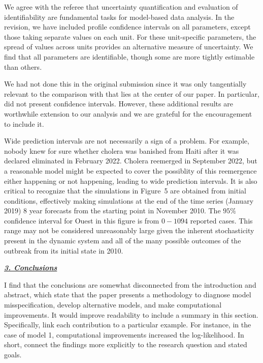 \documentclass[11pt]{article}
\newcommand\report[1]{{\color{mygreen} \vspace{1mm}\hspace{0.25in}\parbox{6in}{\em #1}}}
\begin{document}
We agree with the referee that uncertainty quantification and evaluation of identifiability are fundamental tasks for model-based data analysis.
In the revision, we have included profile confidence intervals on all parameters, except those taking separate values on each unit.
For these unit-specific parameters, the spread of values across units provides an alternative measure of uncertainty.
We find that all parameters are identifiable, though some are more tightly estimable than others.

We had not done this in the original submission since it was only tangentially relevant to the comparison with \cite{lee20} that lies at the center of our paper.
In particular, \cite{lee20} did not present confidence intervals.
However, these additional results are worthwhile extension to our analysis and we are grateful for the encouragement to include it.

Wide prediction intervals are not necessarily a sign of a problem.
For example, nobody knew for sure whether cholera was banished from Haiti after it was declared eliminated in February 2022.
Cholera reemerged in September 2022, but a reasonable model might be expected to cover the possiblity of this reemergence either happening or not happening, leading to wide prediction intervals.
It is also critical to recognize that the simulations in Figure~5 are obtained from initial conditions, effectively making simulations at the end of the time series (January 2019) 8 year forecasts from the starting point in November 2010.
The $95\%$ confidence interval for Ouest in this figure is from $0-1094$ reported cases. This range may not be considered unreasonably large given the inherent stochasticity present in the dynamic system and all of the many possible outcomes of the outbreak from its initial state in 2010.

\report{
  \textbf{\underline{3. Conclusions}}

  I find that the conclusions are somewhat disconnected from the introduction and abstract, which state that the paper presents a methodology to diagnose model misspecification, develop alternative models, and make computational improvements. It would improve readability to include a summary in this section. Specifically, link each contribution to a particular example. For instance, in the case of model 1, computational improvements increased the log-likelihood. In short, connect the findings more explicitly to the research question and stated goals.
}
\end{document}
